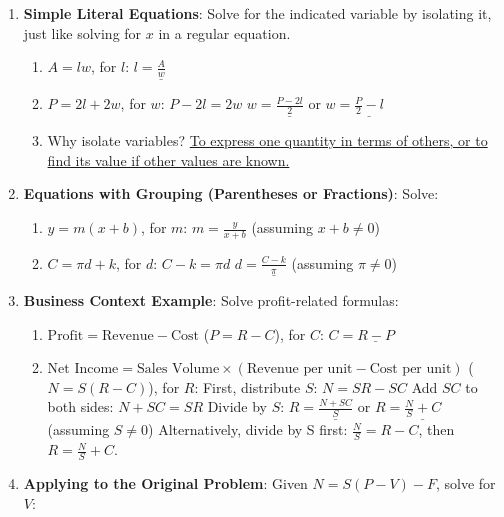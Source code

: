 \documentclass[12pt]{article}
\begin{document}
\begin{enumerate}[label=10.\arabic*]
    \item \textbf{Simple Literal Equations}: Solve for the indicated variable by isolating it, just like solving for \( x \) in a regular equation.
    \begin{enumerate}[label=\alph*)]
        \item \( A = lw \), for \( l \): \( l = \underline{\frac{A}{w}} \)
        \item \( P = 2l + 2w \), for \( w \):
        \( P - 2l = 2w \)
        \( w = \underline{\frac{P - 2l}{2}} \) or \( w = \underline{\frac{P}{2} - l} \)
        \item Why isolate variables? \underline{To express one quantity in terms of others, or to find its value if other values are known.}
    \end{enumerate}
    \item \textbf{Equations with Grouping (Parentheses or Fractions)}: Solve:
    \begin{enumerate}[label=\alph*)]
        \item \( y = m(x + b) \), for \( m \): \( m = \frac{y}{x + b} \) (assuming \(x+b \neq 0\))
        \item \( C = \pi d + k \), for \( d \):
        \( C - k = \pi d \)
        \( d = \underline{\frac{C-k}{\pi}} \) (assuming \(\pi \neq 0\))
    \end{enumerate}
    \item \textbf{Business Context Example}: Solve profit-related formulas:
    \begin{enumerate}[label=\alph*)]
        \item \( \text{Profit} = \text{Revenue} - \text{Cost} \) (\( P = R - C \)), for \( C \): \( C = \underline{R - P} \)
        \item \( \text{Net Income} = \text{Sales Volume} \times (\text{Revenue per unit} - \text{Cost per unit}) \) (\( N = S(R - C) \)), for \( R \):
        First, distribute \(S\): \( N = SR - SC \)
        Add \(SC\) to both sides: \( N + SC = SR \)
        Divide by \(S\): \( R = \underline{\frac{N + SC}{S}} \) or \( R = \underline{\frac{N}{S} + C} \) (assuming \(S \neq 0\))
        Alternatively, divide by S first: \(\frac{N}{S} = R-C\), then \(R = \frac{N}{S} + C\).
    \end{enumerate}
    \item \textbf{Applying to the Original Problem}: Given \( N = S(P - V) - F \), solve for \( V \):
    \begin{enumerate}[label=\alph*)]

\end{enumerate}
\end{enumerate}
\end{document}
